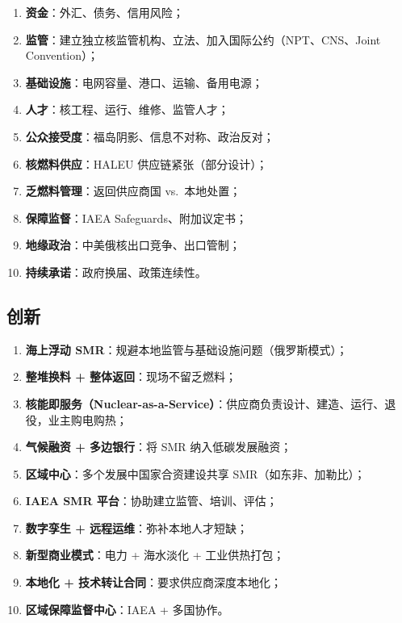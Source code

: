 \documentclass[
  UTF8,
  scheme=plain,
  fontsize=10pt,
  openany
]{ctexbook}
\begin{document}
\begin{enumerate}
\def\labelenumi{\arabic{enumi}.}
\tightlist
\item
  \textbf{资金}：外汇、债务、信用风险；
\item
  \textbf{监管}：建立独立核监管机构、立法、加入国际公约（NPT、CNS、Joint
  Convention）；
\item
  \textbf{基础设施}：电网容量、港口、运输、备用电源；
\item
  \textbf{人才}：核工程、运行、维修、监管人才；
\item
  \textbf{公众接受度}：福岛阴影、信息不对称、政治反对；
\item
  \textbf{核燃料供应}：HALEU 供应链紧张（部分设计）；
\item
  \textbf{乏燃料管理}：返回供应商国 vs.~本地处置；
\item
  \textbf{保障监督}：IAEA Safeguards、附加议定书；
\item
  \textbf{地缘政治}：中美俄核出口竞争、出口管制；
\item
  \textbf{持续承诺}：政府换届、政策连续性。
\end{enumerate}

\subsection{创新}\label{ux521bux65b0}

\begin{enumerate}
\def\labelenumi{\arabic{enumi}.}
\tightlist
\item
  \textbf{海上浮动 SMR}：规避本地监管与基础设施问题（俄罗斯模式）；
\item
  \textbf{整堆换料 + 整体返回}：现场不留乏燃料；
\item
  \textbf{核能即服务（Nuclear-as-a-Service）}：供应商负责设计、建造、运行、退役，业主购电购热；
\item
  \textbf{气候融资 + 多边银行}：将 SMR 纳入低碳发展融资；
\item
  \textbf{区域中心}：多个发展中国家合资建设共享 SMR（如东非、加勒比）；
\item
  \textbf{IAEA SMR 平台}：协助建立监管、培训、评估；
\item
  \textbf{数字孪生 + 远程运维}：弥补本地人才短缺；
\item
  \textbf{新型商业模式}：电力 + 海水淡化 + 工业供热打包；
\item
  \textbf{本地化 + 技术转让合同}：要求供应商深度本地化；
\item
  \textbf{区域保障监督中心}：IAEA + 多国协作。
\end{enumerate}
\end{document}
